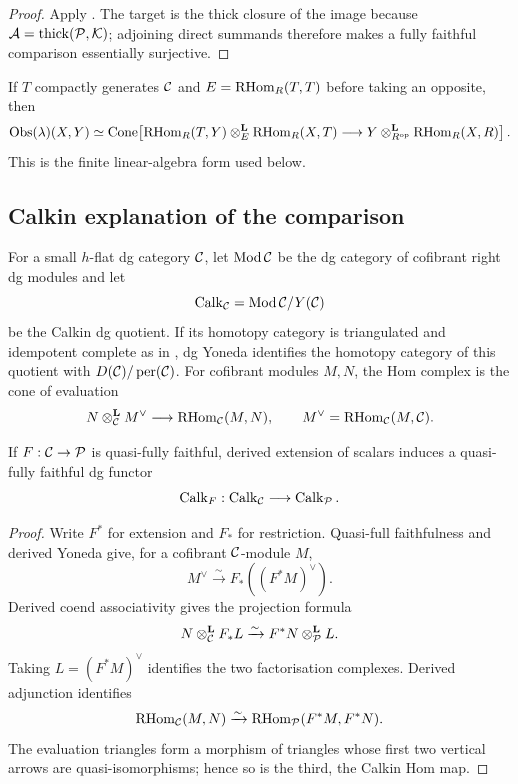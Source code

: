 \begin{proof}
Apply .  The target is the thick closure of the image because \(\mathcal A=\operatorname{thick}(\mathcal P,\mathcal K)\); adjoining direct summands therefore makes a fully faithful comparison essentially surjective.
\end{proof}

If \(T\) compactly generates \(\mathcal C\) and \(E=\operatorname{RHom}_R(T,T)\) before taking an opposite, then
\begin{equation}\label{eq:one-object-obs}
 \operatorname{Obs}(\lambda)(X,Y)\simeq
 \operatorname{Cone}\!\left[
 \operatorname{RHom}_R(T,Y)\otimes^{\mathbf L}_E\operatorname{RHom}_R(X,T)
 \longrightarrow
 Y\otimes^{\mathbf L}_{R^{\mathrm{op}}}\operatorname{RHom}_R(X,R)
 \right].
\end{equation}
This is the finite linear-algebra form used below.

\subsection{Calkin explanation of the comparison}
For a small \(h\)-flat dg category \(\mathcal C\), let \(\operatorname{Mod}\mathcal C\) be the dg category of cofibrant right dg modules and let
\[
 \operatorname{Calk}_{\mathcal C}=\operatorname{Mod}\mathcal C/Y(\mathcal C)
\]
be the Calkin dg quotient.  If its homotopy category is triangulated and idempotent complete as in , dg Yoneda identifies the homotopy category of this quotient with \(D(\mathcal C)/\operatorname{per}(\mathcal C)\).  For cofibrant modules \(M,N\), the Hom complex is the cone of evaluation
\[
 N\otimes^{\mathbf L}_{\mathcal C}M^\vee\longrightarrow\operatorname{RHom}_{\mathcal C}(M,N),
 \qquad M^\vee=\operatorname{RHom}_{\mathcal C}(M,\mathcal C).
\]

\begin{lemma}\label{lem:calkin-full}
If \(F:\mathcal C\to\mathcal P\) is quasi-fully faithful, derived extension of scalars induces a quasi-fully faithful dg functor
\[
 \operatorname{Calk}_F:\operatorname{Calk}_{\mathcal C}\longrightarrow\operatorname{Calk}_{\mathcal P}.
\]
\end{lemma}

\begin{proof}
Write \(F^*\) for extension and \(F_*\) for restriction.  Quasi-full faithfulness and derived Yoneda give, for a cofibrant \(\mathcal C\)-module \(M\),
\[
 M^\vee\xrightarrow{\sim}F_*((F^*M)^\vee).
\]
Derived coend associativity gives the projection formula
\[
 N\otimes^{\mathbf L}_{\mathcal C}F_*L\xrightarrow{\sim}F^*N\otimes^{\mathbf L}_{\mathcal P}L.
\]
Taking \(L=(F^*M)^\vee\) identifies the two factorisation complexes.  Derived adjunction identifies
\[
 \operatorname{RHom}_{\mathcal C}(M,N)\xrightarrow{\sim}
 \operatorname{RHom}_{\mathcal P}(F^*M,F^*N).
\]
The evaluation triangles form a morphism of triangles whose first two vertical arrows are quasi-isomorphisms; hence so is the third, the Calkin Hom map.
\end{proof}

